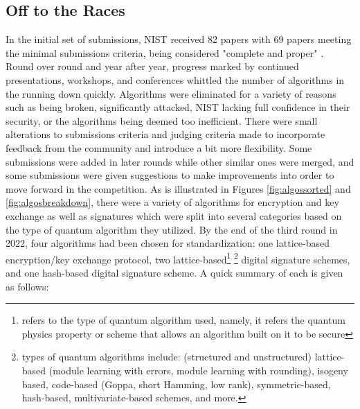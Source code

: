 \subsection{Off to the Races}
In the initial set of submissions, NIST received 82 papers with 69 papers meeting the minimal submissions criteria, being considered "complete and proper" \cite{moody_lets_2018}. Round over round and year after year, progress marked by continued presentations, workshops, and conferences whittled the number of algorithms in the running down quickly. Algorithms were eliminated for a variety of reasons such as being broken, significantly attacked, NIST lacking full confidence in their security, or the algorithms being deemed too inefficient. There were small alterations to submissions criteria and judging criteria made to incorporate feedback from the community and introduce a bit more flexibility. Some submissions were added in later rounds while other similar ones were merged, and some submissions were given suggestions to make improvements into order to move forward in the competition. As is illustrated in Figures \ref{fig:algossorted} and \ref{fig:algosbreakdown}, there were a variety of algorithms for encryption and key exchange as well as signatures which were split into several categories based on the type of quantum algorithm they utilized. By the end of the third round in 2022, four algorithms had been chosen for standardization: one lattice-based encryption/key exchange protocol, two lattice-based\footnote{refers to the type of quantum algorithm used, namely, it refers the quantum physics property or scheme that allows an algorithm built on it to be secure} \footnote{types of quantum algorithms include: 
(structured and unstructured) lattice-based (module learning with errors, module learning with rounding), isogeny based, code-based (Goppa, short Hamming, low rank), symmetric-based, hash-based, multivariate-based schemes, and more.} digital signature schemes, and one hash-based digital signature scheme. A quick summary of each is given as follows:

